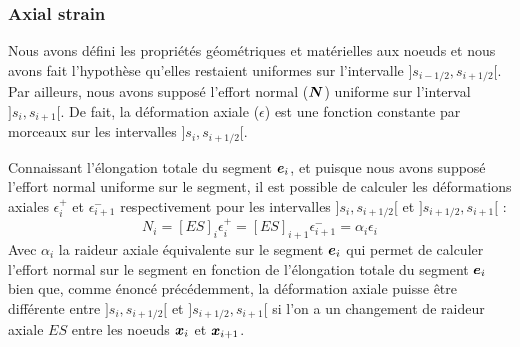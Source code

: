\subsubsection{Axial strain}
Nous avons défini les propriétés géométriques et matérielles aux noeuds et nous avons fait l'hypothèse qu'elles restaient uniformes sur l'intervalle $]s_{i-1/2},s_{i+1/2}[$. Par ailleurs, nous avons supposé l'effort normal ($\boldsymbol{N}$) uniforme sur l'interval  $]s_i,s_{i+1}[$. De fait, la déformation axiale ($\epsilon$) est une fonction constante par morceaux sur les intervalles $]s_i,s_{i+1/2}[$.

Connaissant l'élongation totale du segment $\boldsymbol{e}_i$, et puisque nous avons supposé l'effort normal uniforme sur le segment, il est possible de calculer les déformations axiales $\epsilon_{i}^{+}$ et $\epsilon_{i+1}^{-}$ respectivement pour les intervalles $]s_i,s_{i+1/2}[$ et $]s_{i+1/2},s_{i+1}[$ :
\begin{equation}
	N_i = [ES]_{i} \epsilon_{i}^{+}
	= [ES]_{i+1} \epsilon_{i+1}^{-}
	= \alpha_i \epsilon_i
\end{equation}
Avec $\alpha_i$ la raideur axiale équivalente sur le segment $\boldsymbol{e}_i$ qui permet de calculer l'effort normal sur le segment en fonction de l'élongation totale du segment $\boldsymbol{e}_i$ bien que, comme énoncé précédemment, la déformation axiale puisse être différente entre $]s_i,s_{i+1/2}[$ et $]s_{i+1/2},s_{i+1}[$ si l'on a un changement de raideur axiale $ES$ entre les noeuds $\boldsymbol{x}_i$ et $\boldsymbol{x}_{i+1}$.

